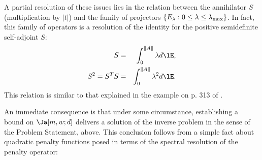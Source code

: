 A partial resolution of these issues lies in the relation between the
annihilator $S$ (multiplication by $|t|$) and the family of projectors
$\{E_{\lambda}: 0 \le \lambda \le \lambda_{\rm max}\}$. In fact, this
family of operators is a resolution of the identity for the positive
semidefinite self-adjoint $S$:
\begin{eqnarray}
  \label{eqn:res1}
  S &=& \int_{0}^{\|A\|} \lambda d\lE,\nonumber\\
  S^2=S^TS  &=& \int_{0}^{\|A\|} \lambda^2 d\lE.
\end{eqnarray}
This relation is similar to that explained in the example on p. 313 of \cite{Yosida}.

An immediate consequence  is that under some
circumstance, establishing a bound on $\Ja[m,w;d]$ delivers a solution
of the inverse problem in the sense of the Problem Statement,
above.  This conclusion follows from a simple fact about quadratic
penalty functions posed in terms of the spectral resolution of the
penalty operator:

